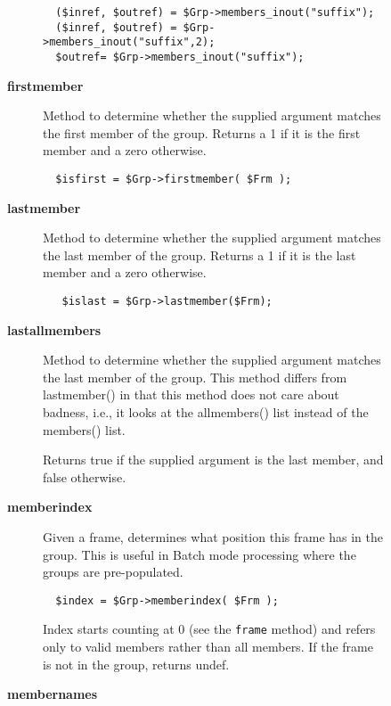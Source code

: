 \begin{description}
\begin{description}
\begin{description}
\begin{verbatim}
  ($inref, $outref) = $Grp->members_inout("suffix");
  ($inref, $outref) = $Grp->members_inout("suffix",2);
  $outref= $Grp->members_inout("suffix");
\end{verbatim}

\item[{\textbf{firstmember}}] \mbox{}

Method to determine whether the supplied argument matches the first
member of the group. Returns a 1 if it is the first member and a zero
otherwise.

\begin{verbatim}
  $isfirst = $Grp->firstmember( $Frm );
\end{verbatim}

\item[{\textbf{lastmember}}] \mbox{}

Method to determine whether the supplied argument
matches the last member of the group. Returns a 1 if
it is the last member and a zero otherwise.

\begin{verbatim}
   $islast = $Grp->lastmember($Frm);
\end{verbatim}

\item[{\textbf{lastallmembers}}] \mbox{}

Method to determine whether the supplied argument matches the last
member of the group. This method differs from lastmember() in that
this method does not care about badness, i.e., it looks at the
allmembers() list instead of the members() list.



Returns true if the supplied argument is the last member, and false
otherwise.


\item[{\textbf{memberindex}}] \mbox{}

Given a frame, determines what position this frame has in the
group. This is useful in Batch mode processing where the
groups are pre-populated.

\begin{verbatim}
  $index = $Grp->memberindex( $Frm );
\end{verbatim}


Index starts counting at 0 (see the \texttt{frame} method)
and refers only to valid members rather than all members.
If the frame is not in the group, returns undef.


\item[{\textbf{membernames}}] \mbox{}


\end{description}
\end{description}
\end{description}
